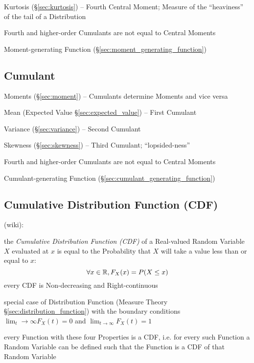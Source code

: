 Kurtosis (\S\ref{sec:kurtosis}) -- Fourth Central Moment; Measure of the
``heaviness'' of the tail of a Distribution

Fourth and higher-order Cumulants are not equal to Central Moments

\fist Moment-generating Function (\S\ref{sec:moment_generating_function})



\subsection{Cumulant}\label{sec:cumulant}

\fist Moments (\S\ref{sec:moment}) -- Cumulants determine Moments and vice
versa

Mean (Expected Value \S\ref{sec:expected_value}) -- First Cumulant

Variance (\S\ref{sec:variance}) -- Second Cumulant

Skewness (\S\ref{sec:skewness}) -- Third Cumulant; ``lopsided-ness''

Fourth and higher-order Cumulants are not equal to Central Moments

\fist Cumulant-generating Function (\S\ref{sec:cumulant_generating_function})



\subsection{Cumulative Distribution Function (CDF)}\label{sec:cdf}

(wiki):

the \emph{Cumulative Distribution Function (CDF)} of a Real-valued Random
Variable $X$ evaluated at $x$ is equal to the Probability that $X$ will take a
value less than or equal to $x$:
\[
  \forall x \in \mathbb{R}, F_X(x) = P(X \leq x)
\]
every CDF is Non-decreasing and Right-continuous

special case of Distribution Function (Measure Theory
\S\ref{sec:distribution_function}) with the boundary conditions
$\lim_t\rightarrow\infty F_X(t) = 0$ and $\lim_{t\rightarrow\infty}F_X(t) = 1$

every Function with these four Properties is a CDF, i.e. for every such Function
a Random Variable can be defined such that the Function is a CDF of that Random
Variable

